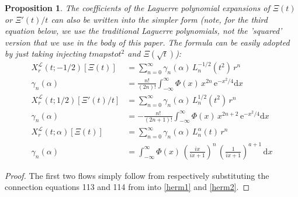 \documentclass[a4paper,11pt,twoside]{amsart}
\newtheorem{proposition}[theorem]{Proposition}
\newcommand{\verifiedeq}{=}
\newcommand{\verifiedeq}{\stackrel{\checkmark}{=}}
\begin{document}
\begin{proposition}
The coefficients of the Laguerre polynomial expansions of $\Xi(t)$ or $\Xi'(t)/t$ can also be written into the simpler form (note, for the third equation below, we use the traditional Laguerre polynomials, not the 'squared' version that we use in the body of this paper. The formula can be easily adopted by just taking injecting $t maps to t^2$ and $\Xi(\sqrt{t})$): 
\begin{align}
X^{\mathcal{L}}_r(t;-1/2)\left[\Xi(t)\right] &\verifiedeq \sum_{n=0}^\infty \gamma_n(\alpha)\,L^{-1/2}_n\left(t^2\right)\,r^n \\
\gamma_n(\alpha) &\verifiedeq \frac{n!}{(2n)!}\int_{-\infty}^{\infty} \Phi(x)\,x^{2n}\,\mathrm{e}^{-x^2/4}\mathrm{d}x \\
X^{\mathcal{L}}_r(t;1/2)\left[\Xi'(t)/t\right] &\verifiedeq \sum_{n=0}^\infty \gamma_n(\alpha)\,L^{1/2}_n\left(t^2\right)\,r^n \\
\gamma_n(\alpha) &\verifiedeq -\frac{n!}{(2n+1)!}\int_{-\infty}^{\infty} \Phi(x)\,x^{2n+2}\,\mathrm{e}^{-x^2/4}\mathrm{d}x \\
X^{\mathcal{L}}_r(t;\alpha)\left[\Xi(t)\right] &\verifiedeq \sum_{n=0}^\infty \gamma_n(\alpha)\,L^{\alpha}_n(t)\,r^n \\
\gamma_n(\alpha) &\verifiedeq \int_{-\infty}^{\infty} \Phi(x)\,\left(\frac{ix}{ix+1}\right)^n\,\left(\frac{1}{ix+1}\right)^{a+1}\,\mathrm{d}x
\end{align}
\end{proposition}
\begin{proof}
The first two flows simply follow from respectively substituting the connection equations 113 and 114 from \cite{koesup} into \ref{herm1} and \ref{herm2}.  
\end{proof}
\end{document}
